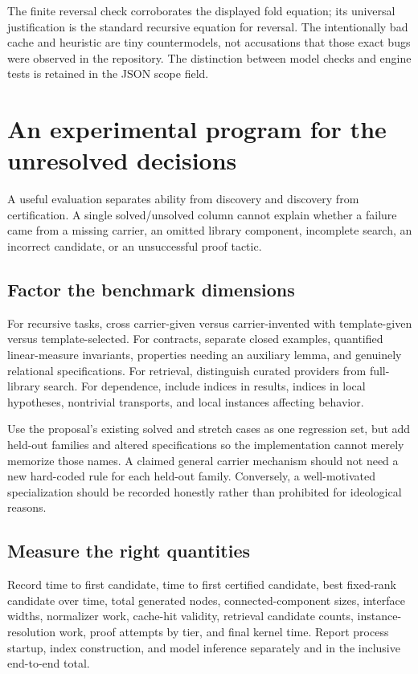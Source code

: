 \documentclass[11pt,a4paper]{article}
\theoremstyle{remark}
\begin{document}
The finite reversal check corroborates the displayed fold equation; its universal justification is the standard recursive equation for reversal. The intentionally bad cache and heuristic are tiny countermodels, not accusations that those exact bugs were observed in the repository. The distinction between model checks and engine tests is retained in the JSON scope field.

\section{An experimental program for the unresolved decisions}\label{sec:experiments}

A useful evaluation separates ability from discovery and discovery from certification. A single solved/unsolved column cannot explain whether a failure came from a missing carrier, an omitted library component, incomplete search, an incorrect candidate, or an unsuccessful proof tactic.

\subsection{Factor the benchmark dimensions}

For recursive tasks, cross carrier-given versus carrier-invented with template-given versus template-selected. For contracts, separate closed examples, quantified linear-measure invariants, properties needing an auxiliary lemma, and genuinely relational specifications. For retrieval, distinguish curated providers from full-library search. For dependence, include indices in results, indices in local hypotheses, nontrivial transports, and local instances affecting behavior.

Use the proposal's existing solved and stretch cases as one regression set, but add held-out families and altered specifications so the implementation cannot merely memorize those names. A claimed general carrier mechanism should not need a new hard-coded rule for each held-out family. Conversely, a well-motivated specialization should be recorded honestly rather than prohibited for ideological reasons.

\subsection{Measure the right quantities}

Record time to first candidate, time to first certified candidate, best fixed-rank candidate over time, total generated nodes, connected-component sizes, interface widths, normalizer work, cache-hit validity, retrieval candidate counts, instance-resolution work, proof attempts by tier, and final kernel time. Report process startup, index construction, and model inference separately and in the inclusive end-to-end total.
\end{document}
